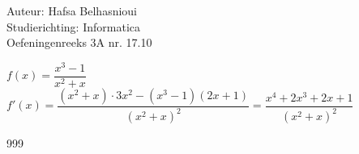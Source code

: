 \documentclass[a4paper]{article}
\begin{document}
\noindent \large Auteur: Hafsa Belhasnioui\\
\noindent \large Studierichting: Informatica\\
\noindent \large Oefeningenreeks 3A nr. 17.10\\

\medskip

\normalsize

$f(x) = \dfrac{x^3 - 1}{x^2 + x}$\\

$f'(x) = \dfrac{(x^2 + x) \cdot 3x^2 - (x^3 - 1)(2x + 1)}{(x^2 + x)^2} = \dfrac{x^4 + 2x^3 + 2x + 1}{(x^2 + x)^2}$\\


\begin{thebibliography}{999}
\end{thebibliography}
\end{document}
